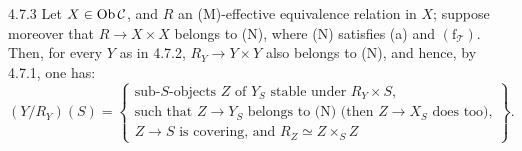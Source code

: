 \begin{corollary}{4.7.3}\label{IV.4.7.3}
Let \(X\in\operatorname{Ob}\mathcal C\), and \(R\) an (M)-effective equivalence
relation in \(X\); suppose moreover that \(R\to X\times X\)
belongs to (N), where (N) satisfies (a) and
\((\mathrm f_{\mathcal T})\).
Then, for every \(Y\) as in 4.7.2, \(R_Y\to Y\times Y\)
also belongs to (N), and hence, by 4.7.1, one has:
\[
(Y/R_Y)(S)=\left\{\begin{array}{l}
\text{sub-}S\text{-objects }Z\text{ of }Y_S\text{ stable under }R_Y\times S,\\
\text{such that }Z\to Y_S\text{ belongs to (N) (then }Z\to X_S
\text{ does too),}\\
Z\to S\text{ is covering, and }R_Z\simeq Z\times_S Z
\end{array}\right\}.
\]
\end{corollary}

